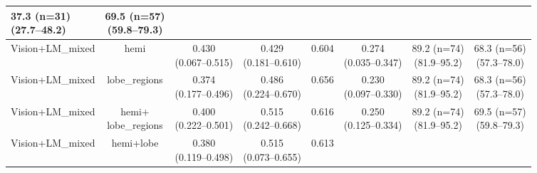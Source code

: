 \documentclass[FCD_GNN.tex]{subfiles}
\begin{document}
\begin{table}[H]
\begin{tabular}{lccccccc}
    \makecell{37.3 (n=31) \\ (27.7--48.2)} &
    \makecell{\colorbox{orange!15}{69.5 (n=57)} \\ (59.8--79.3)} \\
    \hline
    Vision+LM\_mixed & 
    hemi &  
    \makecell{\colorbox{green!15}{0.430} \\ (0.067--0.515)} &
    \makecell{0.429 \\ (0.181--0.610)} &
    0.604 &
    \makecell{\colorbox{green!15}{0.274} \\ (0.035--0.347)} &
    \makecell{89.2 (n=74) \\ (81.9--95.2)} & 
    \makecell{68.3 (n=56) \\ (57.3--78.0)} \\
    \hline
    Vision+LM\_mixed &
    lobe\_regions &
    \makecell{0.374 \\ (0.177--0.496)} &
    \makecell{\colorbox{cyan!15}{0.486} \\ (0.224--0.670)} &
    \colorbox{green!15}{0.656} &
    \makecell{0.230 \\ (0.097--0.330)} &
    \makecell{89.2 (n=74) \\ (81.9--95.2)} & 
    \makecell{68.3 (n=56) \\ (57.3--78.0)} \\
    \hline
    Vision+LM\_mixed & 
    \makecell{hemi+ \\lobe\_regions} &
    \makecell{\colorbox{orange!15}{0.400} \\ (0.222--0.501)} &
    \makecell{\colorbox{green!15}{0.515} \\ (0.242--0.668)} &
    \colorbox{orange!15}{0.616} &
    \makecell{\colorbox{orange!15}{0.250} \\ (0.125--0.334)} &
    \makecell{89.2 (n=74) \\ (81.9--95.2)} & 
    \makecell{\colorbox{orange!15}{69.5 (n=57)} \\ (59.8--79.3)} \\
    \hline
    Vision+LM\_mixed &
    hemi+lobe & 
    \makecell{0.380 \\ (0.119--0.498)} &
    \makecell{\colorbox{green!15}{0.515} \\ (0.073--0.655)} &
    0.613 &

\end{tabular}
\end{table}
\end{document}
